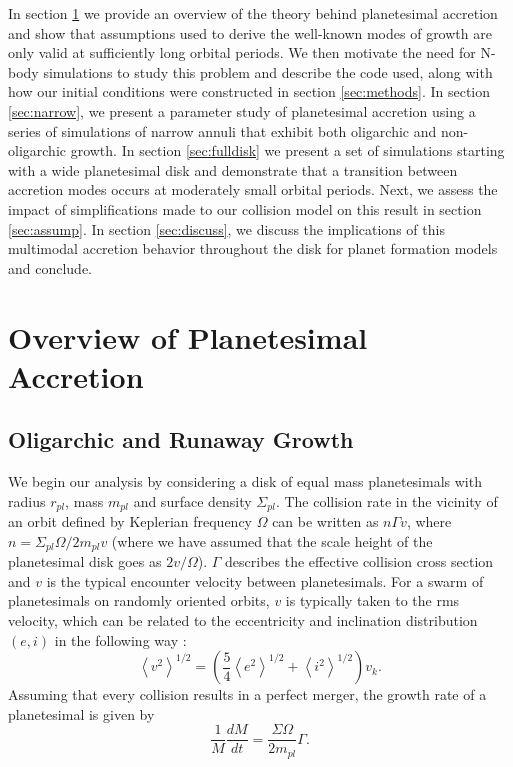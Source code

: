\documentclass[twocolumn,linenumbers]{aastex63}
\begin{document}
In section \ref{sec:theory} we provide an overview of the theory
behind planetesimal accretion and show that assumptions used to derive
the well-known modes of growth are only valid at sufficiently long
orbital periods. We then motivate the need for N-body simulations to
study this problem and describe the code used, along with how our
initial conditions were constructed in section \ref{sec:methods}. In
section \ref{sec:narrow}, we present a parameter study of planetesimal
accretion using a series of simulations of narrow annuli that exhibit both oligarchic and non-oligarchic growth. In section 
\ref{sec:fulldisk} we present a set of simulations starting with a  wide planetesimal disk and demonstrate that a transition 
between accretion modes occurs at moderately small orbital periods. Next, we assess the impact of 
simplifications made to our collision model on this result in section \ref{sec:assump}. In section \ref{sec:discuss}, we discuss the 
implications of this multimodal accretion behavior throughout the disk for planet formation models and conclude.

\section{Overview of Planetesimal Accretion}\label{sec:theory}

\subsection{Oligarchic and Runaway Growth}

We begin our analysis by considering a disk of equal mass planetesimals
with radius $r_{pl}$, mass $m_{pl}$ and surface density
$\Sigma_{pl}$. The collision rate in the vicinity of an orbit defined
by Keplerian frequency $\Omega$ can be written as $n \Gamma v$, where
$n = \Sigma_{pl} \Omega / 2 m_{pl} v$ (where we have assumed that the scale height of the planetesimal disk goes as $2v/\Omega$). $\Gamma$ describes the effective
collision cross section and $v$ is the typical encounter velocity
between planetesimals.
For a swarm of planetesimals on randomly oriented orbits, $v$ is typically
taken to the rms velocity, which can be related to the eccentricity and inclination distribution $(e, i)$ in the following way \citep{lissauer93}:
\begin{equation}\label{eq:ecc_vel}
	\left< v^{2} \right>^{1/2} = \left( \frac{5}{4} \left< e^{2} \right>^{1/2} + \left< i^{2} \right>^{1/2}  \right) v_{k}.
\end{equation}
Assuming that every collision results in a perfect merger, the growth rate of a planetesimal is given by
\begin{equation}\label{eq:growth}
	\frac{1}{M}\frac{dM}{dt} = \frac{\Sigma \Omega}{2 m_{pl}} \Gamma.
\end{equation}
\end{document}
